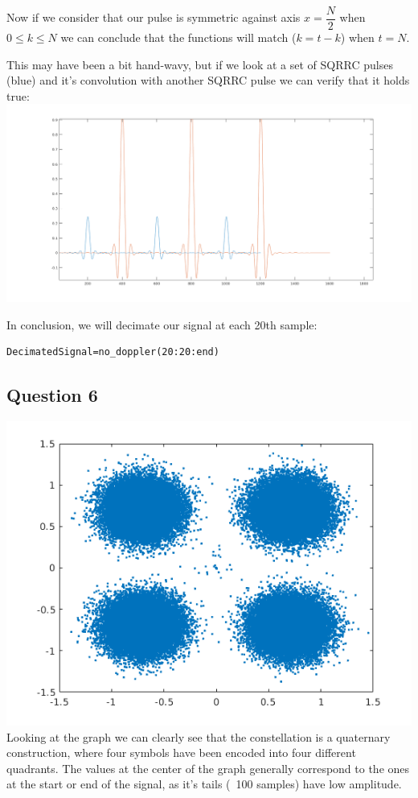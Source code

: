 \documentclass[conference,9pt]{IEEEtran}
\begin{document}
Now if we consider that our pulse is symmetric against axis $x=\dfrac{N}{2}$ when $0\leq k\leq N$ we can conclude that the functions will match ($k=t-k$) when $t=N$.

This may have been a bit hand-wavy, but if we look at a set of SQRRC pulses (blue) and it's convolution with another SQRRC pulse we can verify that it holds true:
\includegraphics[scale=0.23]{convs}

In conclusion, we will decimate our signal at each 20th sample:
\begin{verbatim}
DecimatedSignal=no_doppler(20:20:end)
\end{verbatim}

\subsection{Question 6}
\includegraphics[scale=0.6]{res}
Looking at the graph we can clearly see that the constellation is a quaternary construction, where four symbols have been encoded into four different quadrants. The values at the center of the graph generally correspond to the ones at the start or end of the signal, as it's tails (~100 samples) have low amplitude.
\end{document}
